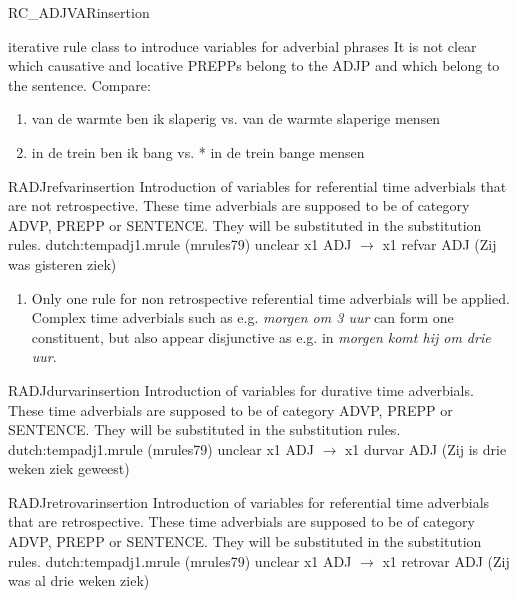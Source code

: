 \newpage
\begin{mruleclass}{RC\_ADJVARinsertion}
\begin{classdescr}
\kind iterative rule class
\classtask to introduce variables for adverbial phrases
\classremarks
It is not clear which causative and locative PREPPs belong to the ADJP
and which belong to the sentence. 
Compare: 
\begin{enumerate}
  \item 
   van de warmte ben ik slaperig  vs. van de warmte slaperige mensen 
  \item
  in de trein ben ik bang vs. * in de trein bange mensen\
\end{enumerate}
\nofilters

\nospeedrules

\noplannedrules

\norulesnotince


\end{classdescr}

\begin{members}
\begin{member}
 RADJrefvarinsertion
 Introduction of variables for referential time adverbials that 
are not retrospective. These time adverbials are supposed to be of category 
ADVP, PREPP or SENTENCE. They will be substituted in the substitution rules.
\file dutch:tempadj1.mrule (mrules79)
\semantics unclear
\example x1 ADJ $\rightarrow$ x1 refvar ADJ (Zij was gisteren ziek)
  \remarks\mbox{}
\begin{enumerate}
\item  Only one rule for non retrospective referential time adverbials 
will be applied. Complex time adverbials such as e.g. {\em morgen om 3 uur} can 
form one constituent, but also appear disjunctive as e.g. in {\em morgen komt 
hij om drie uur}. 
\end{enumerate}

\end{member}
\begin{member}
 RADJdurvarinsertion
 Introduction of variables for durative time adverbials.
These time adverbials are supposed to be of category 
ADVP, PREPP or SENTENCE. They will be substituted in the substitution rules.
\file dutch:tempadj1.mrule (mrules79)
\semantics  unclear
\example x1 ADJ $\rightarrow$ x1 durvar ADJ (Zij is drie weken ziek geweest)
  \remarks\mbox{}

\end{member}
\begin{member}
 RADJretrovarinsertion
 Introduction of variables for referential time adverbials that 
are retrospective. These time adverbials are supposed to be of category 
ADVP, PREPP or SENTENCE. They will be substituted in the substitution rules.
\file dutch:tempadj1.mrule (mrules79)
\semantics unclear
\example x1 ADJ $\rightarrow$ x1 retrovar ADJ (Zij was al drie weken ziek)
  \remarks\mbox{} 


\end{member}
\end{members}
\end{mruleclass}
